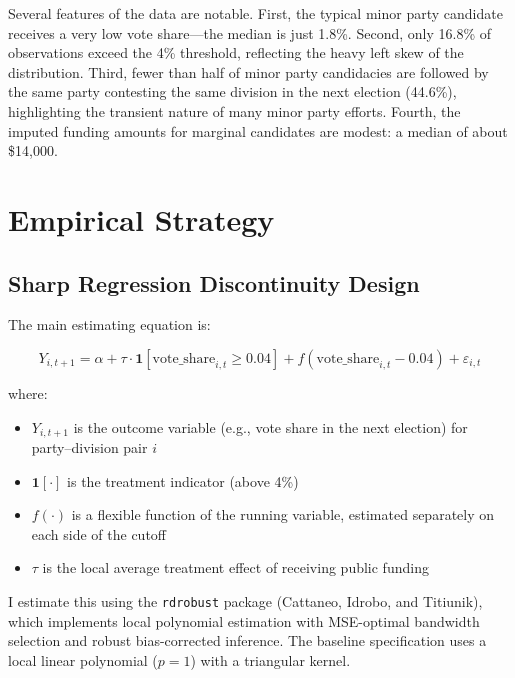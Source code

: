 \documentclass[12pt, a4paper]{article}
\begin{document}
Several features of the data are notable. First, the typical minor party candidate receives a very low vote share---the median is just 1.8\%. Second, only 16.8\% of observations exceed the 4\% threshold, reflecting the heavy left skew of the distribution. Third, fewer than half of minor party candidacies are followed by the same party contesting the same division in the next election (44.6\%), highlighting the transient nature of many minor party efforts. Fourth, the imputed funding amounts for marginal candidates are modest: a median of about \$14,000.

\section{Empirical Strategy}
\label{sec:strategy}

\subsection{Sharp Regression Discontinuity Design}

The main estimating equation is:

\begin{equation}
    Y_{i,t+1} = \alpha + \tau \cdot \mathbf{1}\left[\text{vote\_share}_{i,t} \geq 0.04\right] + f\left(\text{vote\_share}_{i,t} - 0.04\right) + \varepsilon_{i,t}
    \label{eq:rd}
\end{equation}

\noindent where:
\begin{itemize}
    \item $Y_{i,t+1}$ is the outcome variable (e.g., vote share in the next election) for party--division pair $i$
    \item $\mathbf{1}[\cdot]$ is the treatment indicator (above 4\%)
    \item $f(\cdot)$ is a flexible function of the running variable, estimated separately on each side of the cutoff
    \item $\tau$ is the local average treatment effect of receiving public funding
\end{itemize}

I estimate this using the \texttt{rdrobust} package (Cattaneo, Idrobo, and Titiunik), which implements local polynomial estimation with MSE-optimal bandwidth selection and robust bias-corrected inference. The baseline specification uses a local linear polynomial ($p = 1$) with a triangular kernel.
\end{document}
